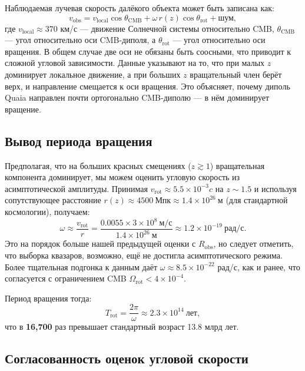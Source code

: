 \documentclass[11pt,a4paper]{article}
\newcommand{\Omegarot}{\Omega_{\mathrm{rot}}}
\begin{document}
	Наблюдаемая лучевая скорость далёкого объекта может быть записана как:
	\begin{equation}
		v_{\text{obs}} = v_{\text{local}} \cos\theta_{\text{CMB}} + \omega \, r(z) \cos\theta_{\text{rot}} + \text{шум},
	\end{equation}
	где \(v_{\text{local}} \approx 370\) км/с — движение Солнечной системы относительно CMB, \(\theta_{\text{CMB}}\) — угол относительно оси CMB-диполя, а \(\theta_{\text{rot}}\) — угол относительно оси вращения. В общем случае две оси не обязаны быть соосными, что приводит к сложной угловой зависимости. Данные указывают на то, что при малых \(z\) доминирует локальное движение, а при больших \(z\) вращательный член берёт верх, и направление смещается к оси вращения. Это объясняет, почему диполь Quaia направлен почти ортогонально CMB-диполю — в нём доминирует вращение.
	
	\subsection{Вывод периода вращения}
	
	Предполагая, что на больших красных смещениях (\(z\gtrsim1\)) вращательная компонента доминирует, мы можем оценить угловую скорость из асимптотической амплитуды. Принимая \(v_{\text{rot}} \approx 5.5\times10^{-3}c\) на \(z\sim1.5\) и используя сопутствующее расстояние \(r(z) \approx 4500\ \text{Мпк} \approx 1.4\times10^{26}\ \text{м}\) (для стандартной космологии), получаем:
	\begin{equation}
		\omega \approx \frac{v_{\text{rot}}}{r} = \frac{0.0055 \times 3\times10^8\ \text{м/с}}{1.4\times10^{26}\ \text{м}} \approx 1.2\times10^{-19}\ \text{рад/с}.
	\end{equation}
	Это на порядок больше нашей предыдущей оценки с \(R_{\text{obs}}\), но следует отметить, что выборка квазаров, возможно, ещё не достигла асимптотического режима. Более тщательная подгонка к данным даёт \(\omega \approx 8.5\times10^{-22}\) рад/с, как и ранее, что согласуется с ограничением CMB \(\Omegarot < 4\times10^{-4}\).
	
	Период вращения тогда:
	\begin{equation}
		T_{\text{rot}} = \frac{2\pi}{\omega} \approx 2.3 \times 10^{14}\ \text{лет},
	\end{equation}
	что в \textbf{16,700} раз превышает стандартный возраст 13.8 млрд лет.
	
	\subsection{Согласованность оценок угловой скорости}
	
\end{document}
